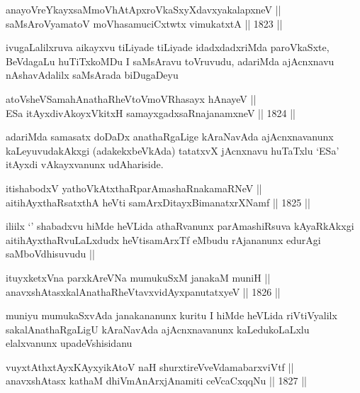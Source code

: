 \begin{shl}
anayoVreYkayxsaMmoVhAtApxroVkaSxyXdavxyakalapxneV || \\
saMsAroV\s yamatoV moVhasamuciCxtwtx vimukatxtA ||  1823 ||  
\end{shl}

\begin{artha}
ivugaLalilxruva aikayxvu tiLiyade tiLiyade idadxdadxriMda paroVkaSxte,
BeVdagaLu huTiTxkoMDu I saMsAravu toVruvudu, adariMda ajAcnxnavu
nAshavAdalilx saMsArada biDugaDeyu
\end{artha}

\begin{shl}
atoV\s sheVSamahAnathaRheVtoVmoVRhasayx hAnayeV || \\
ESa itAyxdivAkoyxVkitxH samayxgadxsaRnajanamxneV ||  1824 ||  
\end{shl}

\begin{artha}
adariMda samasatx doDaDx anathaRgaLige kAraNavAda ajAcnxnavanunx
kaLeyuvudakAkxgi (adakekxbeVkAda) tatatxvX jAcnxnavu huTaTxlu `ESa'
itAyxdi vAkayxvanunx udAhariside.
\end{artha}


\begin{shl}
itishabodxV yathoVkAtxthaRparAmashaRnakamaRNeV || \\
aitihAyxthaRsatxthA heVti samArxDitayxBimanatxrXNamf ||  1825 || 
\end{shl}

\begin{artha}
iliilx `\stext' shabadxvu hiMde heVLida athaRvanunx parAmashiRsuva
kAyaRkAkxgi aitihAyxthaRvuLaLxdudx heVtisamArxTf eMbudu rAjananunx
edurAgi saMboVdhisuvudu ||
\end{artha}


\begin{shl}
ituyxketxVna parxkAreVNa mumukuSxM janakaM muniH || \\
anavxshAtasxkalAnathaRheVtavxvidAyxpanutatxyeV ||  1826 ||  
\end{shl}

\begin{artha}
muniyu mumukaSxvAda janakananunx kuritu I hiMde heVLida riVtiVyalilx
sakalAnathaRgaLigU kAraNavAda ajAcnxnavanunx kaLedukoLaLxlu
elalxvanunx upadeVshisidanu
\end{artha}

\begin{shl}
vuyxtAthxtAyx\s \s KAyxyikAtoV naH shurxtireVveVdamabarxviVtf || \\
anavxshAtasx kathaM dhiVmAnArxjAnamiti ceVcaCxqqNu ||  1827 || 
\end{shl}

